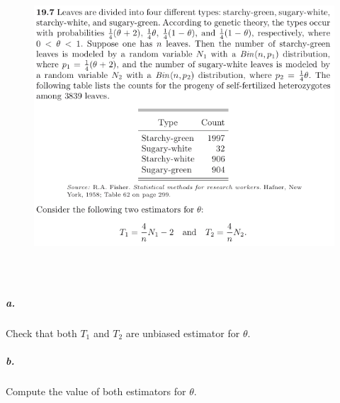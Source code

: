 \documentclass{article} %
\begin{document}
\paragraph*{}
\begin{figure}[h!]
\centering
\includegraphics[width=5.5in, height=4.5in]{4.png}
\end{figure}
\newpage
\subparagraph*{a.} Check that both $T_1$ and $T_2$ are unbiased estimator for $\theta$. 
\subparagraph*{b.} Compute the value of both estimators for $\theta$. 

%
%
\end{document}
